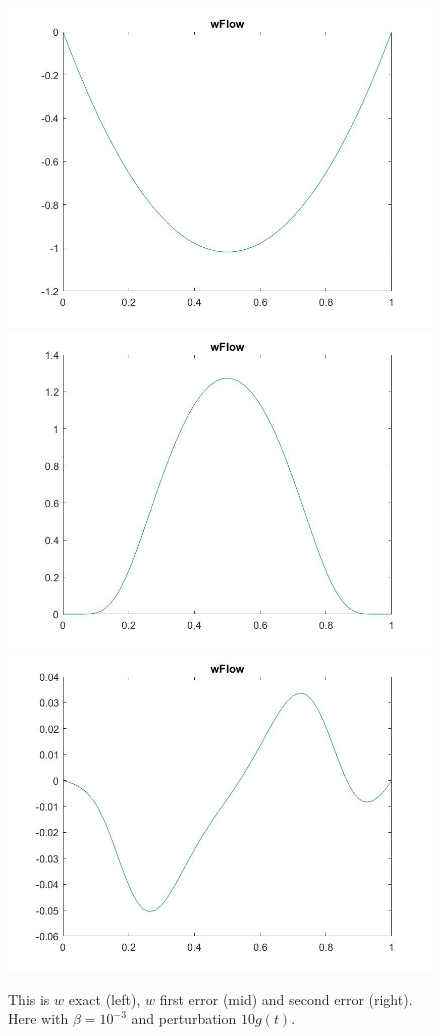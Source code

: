 \documentclass[11pt, a4paper]{article}
\theoremstyle{definition}
\begin{document}
\begin{figure}[h]
	\includegraphics[scale=0.3]{linNwexact1.jpg}
	\includegraphics[scale=0.3]{linNwerr1.jpg}
	\includegraphics[scale=0.3]{linNwerr2.jpg}
	\caption{This is $w$ exact (left), $w$ first error (mid) and second error (right). Here with $\beta =10^{-3}$ and perturbation $10g(t)$.}
	\label{Figlint3a}
\end{figure}
\end{document}
